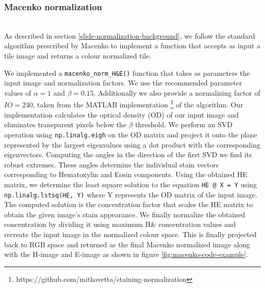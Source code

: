 \documentclass{l4proj}
\begin{document}
\subsubsection{Macenko normalization}\hfill\\
As described in section \ref{slide-normalization-background}, we follow the standard algorithm prescribed by Macenko to implement a function that accepts as input a tile image and returns a colour normalized tile. 

We implemented a \texttt{macenko\_norm\_H\&E()} function that takes as parameters the input image and  normalization factors. We use the recommended parameter values of \(\alpha = 1\) and \(\beta = 0.15\). Additionally we also provide a normalizing factor of \(IO = 240\), taken from the MATLAB implementation \footnote{https://github.com/mitkovetta/staining-normalization} of the algorithm. Our implementation calculates the optical density (OD) of our input image and eliminates transparent pixels below the \(\beta\) threshold. We perform an SVD operation using \texttt{np.linalg.eigh} on the OD matrix and project it onto the plane represented by the largest eigenvalues using a dot product with the corresponding eigenvectors. Computing the angles in the direction of the first SVD we find its robust extremes. These angles determine the individual stain vectors corresponding to Hematoxylin and Eosin components. Using the obtained HE matrix, we determine the least square solution to the equation \texttt{HE @ X = Y} using \texttt{np.linalg.lstsq(HE, Y)} where Y represents the OD matrix of the input image. The computed solution is the concentration factor that scales the HE matrix to obtain the given image's stain appearance. We finally normalize the obtained concentration by dividing it using maximum H\& concentration values and recreate the input image in the normalized colour space. This is finally projected back to RGB space and returned as the final Macenko normalized image along with the H-image and E-image as shown in figure \ref{fig:macenko-code-example}.
\end{document}
